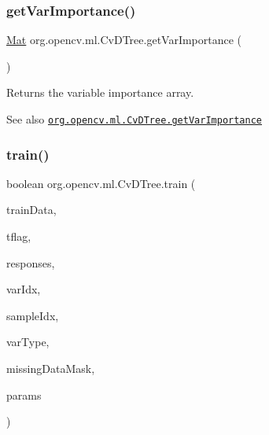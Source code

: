 \mbox{\label{classorg_1_1opencv_1_1ml_1_1_cv_d_tree_aed7572127077a57ce1f9940a439b220b}} 
\subsubsection{\texorpdfstring{get\+Var\+Importance()}{getVarImportance()}}
{\footnotesize\ttfamily \mbox{\hyperlink{classorg_1_1opencv_1_1core_1_1_mat}{Mat}} org.\+opencv.\+ml.\+Cv\+D\+Tree.\+get\+Var\+Importance (\begin{DoxyParamCaption}{ }\end{DoxyParamCaption})}

Returns the variable importance array.

\begin{DoxySeeAlso}{See also}
\href{http://docs.opencv.org/modules/ml/doc/decision_trees.html#cvdtree-getvarimportance}{\tt org.\+opencv.\+ml.\+Cv\+D\+Tree.\+get\+Var\+Importance} 
\end{DoxySeeAlso}
\mbox{\label{classorg_1_1opencv_1_1ml_1_1_cv_d_tree_a5ef591dfad7f9021a49f8aca9848f6d5}} 
\subsubsection{\texorpdfstring{train()}{train()}\hspace{0.1cm}{\footnotesize\ttfamily [1/2]}}
{\footnotesize\ttfamily boolean org.\+opencv.\+ml.\+Cv\+D\+Tree.\+train (\begin{DoxyParamCaption}\item[{\mbox{\hyperlink{classorg_1_1opencv_1_1core_1_1_mat}{Mat}}}]{train\+Data,  }\item[{int}]{tflag,  }\item[{\mbox{\hyperlink{classorg_1_1opencv_1_1core_1_1_mat}{Mat}}}]{responses,  }\item[{\mbox{\hyperlink{classorg_1_1opencv_1_1core_1_1_mat}{Mat}}}]{var\+Idx,  }\item[{\mbox{\hyperlink{classorg_1_1opencv_1_1core_1_1_mat}{Mat}}}]{sample\+Idx,  }\item[{\mbox{\hyperlink{classorg_1_1opencv_1_1core_1_1_mat}{Mat}}}]{var\+Type,  }\item[{\mbox{\hyperlink{classorg_1_1opencv_1_1core_1_1_mat}{Mat}}}]{missing\+Data\+Mask,  }\item[{\mbox{\hyperlink{classorg_1_1opencv_1_1ml_1_1_cv_d_tree_params}{Cv\+D\+Tree\+Params}}}]{params }\end{DoxyParamCaption})}

